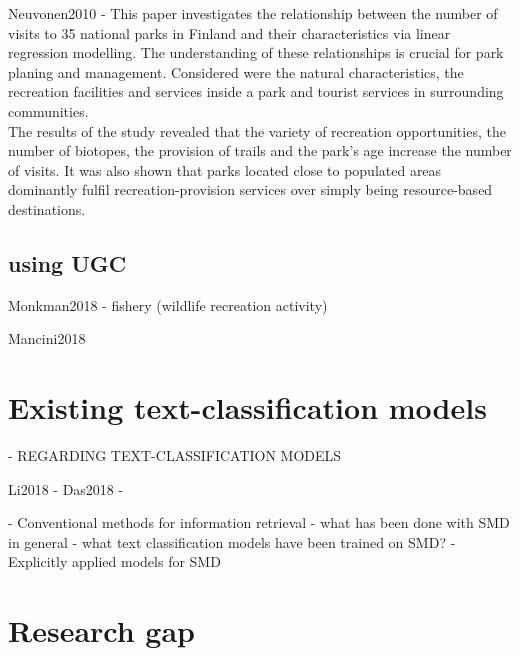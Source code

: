 Neuvonen2010 - This paper investigates the relationship between the number of visits to 35 national parks in Finland and their characteristics via linear regression modelling. The understanding of these relationships is crucial for park planing and management. Considered were the natural characteristics, the recreation facilities and services inside a park and tourist services in surrounding communities. \\
The results of the study revealed that the variety of recreation opportunities, the number of biotopes, the provision of trails and the park's age increase the number of visits. It was also shown that parks located close to populated areas dominantly fulfil recreation-provision services over simply being resource-based destinations.

\subsection{using UGC}

Monkman2018 - fishery (wildlife recreation activity)

Mancini2018
    
\section{Existing text-classification models}
    - REGARDING TEXT-CLASSIFICATION MODELS
    
Li2018 - 
Das2018 - 





    - Conventional methods for information retrieval 
    - what has been done with SMD in general
    - what text classification models have been trained on SMD?
    - Explicitly applied models for SMD    







\section{Research gap}